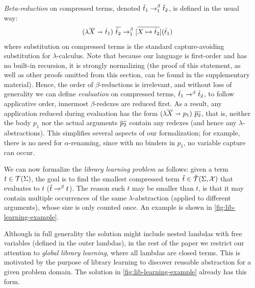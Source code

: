 %

\emph{Beta-reduction} on compressed terms, denoted $\hat{t}_1 \rightarrow^{\beta}_1 \hat{t}_2$, is defined in the usual way:
\[
  (\lambda \overline{X} \ \mathbf{\shortrightarrow}\  \hat{t}_1)\ \overline{\hat{t}_2}  \rightarrow^{\beta}_1 {[\overline{X \mapsto \hat{t}_2}]}({\hat{t}_1}) 
\]
%
where substitution on compressed terms is the standard capture-avoiding substitution for $\lambda$-calculus.
%
Note that because our language is first-order and has no built-in recursion,
it is strongly normalizing
(the proof of this statement, as well as other proofs omitted from this section, can be found in the supplementary material).
%
Hence, the order of $\beta$-reductions is irrelevant,
and without loss of generality we can define \emph{evaluation} on compressed terms, $\hat{t}_1 \rightarrow^{\beta} \hat{t}_2$,
to follow applicative order, \ie innermost $\beta$-redexes are reduced first.
%
As a result, any application reduced during evaluation
has the form $(\lambda \overline{X} \ \mathbf{\shortrightarrow}\  p_1)\ \overline{p_2}$,
that is, neither the body $p_1$ nor the actual arguments $\overline{p_2}$ contain any redexes
(and hence any $\lambda$-abstractions).
%
This simplifies several aspects of our formalization;
for example, there is no need for $\alpha$-renaming, 
since with no binders in $p_1$, no variable capture can occur.


%
%
We can now formalize
  the \emph{library learning problem} as follows:
  given a term $t \in \mathcal{T}(\Sigma)$,
  the goal is to find the smallest compressed term $\hat{t} \in \hat{\mathcal{T}}(\Sigma,\mathcal{X})$
  that evaluates to $t$ (\ie $\hat{t} \rightarrow^{\beta} t$).
%  
The reason such $\hat{t}$ may be smaller than $t$,
  is that it may contain multiple occurrences of the same $\lambda$-abstraction
  (applied to different arguments),
  whose size is only counted once.
%
An example is shown
  in \autoref{fig:lib-learning-example}.

Although in full generality the solution might include nested lambdas with free variables
(defined in the outer lambdas),
in the rest of the paper we restrict our attention to \emph{global library learning},
where all lambdas are closed terms.
%
This is motivated by the purpose of library learning
to discover reusable abstraction for a given problem domain.
%
The solution in \autoref{fig:lib-learning-example} already has this form.

